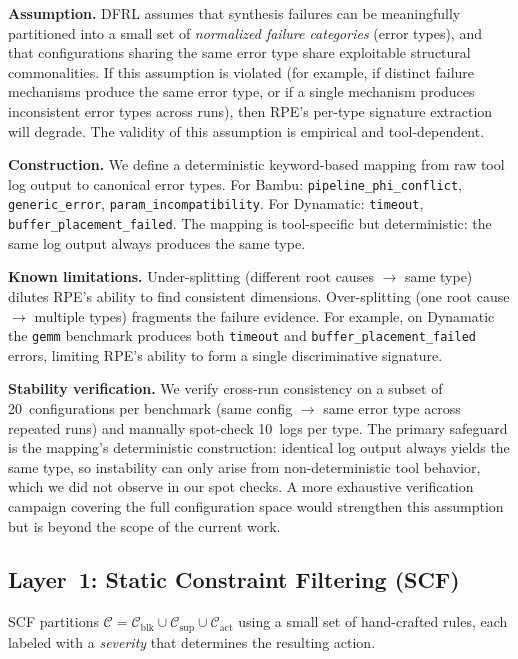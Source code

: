 \documentclass[journal]{IEEEtran}
\begin{document}
\textbf{Assumption.} DFRL assumes that synthesis failures can be meaningfully partitioned into a small set of \emph{normalized failure categories} (error types), and that configurations sharing the same error type share exploitable structural commonalities. If this assumption is violated (for example, if distinct failure mechanisms produce the same error type, or if a single mechanism produces inconsistent error types across runs), then RPE's per-type signature extraction will degrade. The validity of this assumption is empirical and tool-dependent.

\textbf{Construction.} We define a deterministic keyword-based mapping from raw tool log output to canonical error types. For Bambu: \texttt{pipeline\_phi\_conflict}, \texttt{generic\_error}, \texttt{param\_incompatibility}. For Dynamatic: \texttt{timeout}, \texttt{buffer\_placement\_failed}. The mapping is tool-specific but deterministic: the same log output always produces the same type.

\textbf{Known limitations.} Under-splitting (different root causes $\rightarrow$ same type) dilutes RPE's ability to find consistent dimensions. Over-splitting (one root cause $\rightarrow$ multiple types) fragments the failure evidence. For example, on Dynamatic the \texttt{gemm} benchmark produces both \texttt{timeout} and \texttt{buffer\_placement\_failed} errors, limiting RPE's ability to form a single discriminative signature.

\textbf{Stability verification.} We verify cross-run consistency on a subset of 20~configurations per benchmark (same config $\rightarrow$ same error type across repeated runs) and manually spot-check 10~logs per type. The primary safeguard is the mapping's deterministic construction: identical log output always yields the same type, so instability can only arise from non-deterministic tool behavior, which we did not observe in our spot checks. A more exhaustive verification campaign covering the full configuration space would strengthen this assumption but is beyond the scope of the current work.

\subsection{Layer~1: Static Constraint Filtering (SCF)}
\label{sec:scf}

SCF partitions $\mathcal{C} = \mathcal{C}_{\text{blk}} \cup \mathcal{C}_{\text{sup}} \cup \mathcal{C}_{\text{act}}$ using a small set of hand-crafted rules, each labeled with a \emph{severity} that determines the resulting action.
\end{document}
